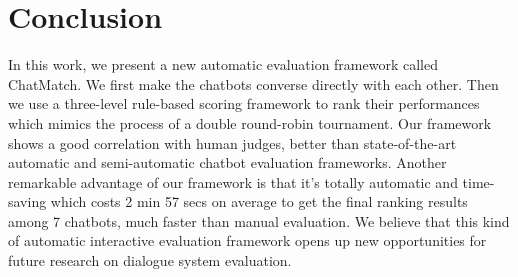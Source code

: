 \section{Conclusion}
\label{sec:conclude}
In this work, we present a new automatic evaluation framework called ChatMatch. 
We first make the chatbots converse directly with each other. 
Then we use a three-level rule-based scoring framework to rank their performances which mimics the process of a double round-robin
tournament. 
Our framework shows a good correlation with human judges, 
better than state-of-the-art automatic and semi-automatic chatbot evaluation frameworks.
Another remarkable advantage of our framework is that it's totally automatic and time-saving which costs 2 min 57 secs on average to get the final ranking results among 7 chatbots, much faster than manual evaluation. %
 We believe that this kind of automatic interactive evaluation framework opens up new opportunities for future research on 
dialogue system evaluation.
